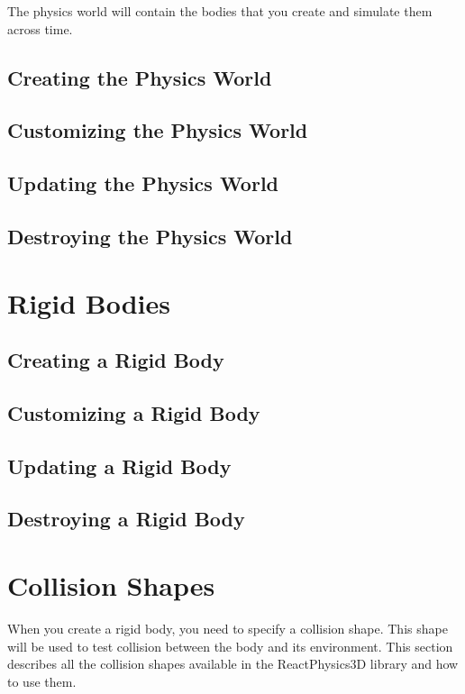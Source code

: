 \documentclass[a4paper,12pt]{article}
\begin{document}
    The physics world will contain the bodies that you create and simulate them across time.

    \subsection{Creating the Physics World}

    \subsection{Customizing the Physics World}

    \subsection{Updating the Physics World}

    \subsection{Destroying the Physics World}

    \section{Rigid Bodies}

    \subsection{Creating a Rigid Body}

    \subsection{Customizing a Rigid Body}

    \subsection{Updating a Rigid Body}

    \subsection{Destroying a Rigid Body}

    \section{Collision Shapes}

    When you create a rigid body, you need to specify a collision shape. This shape will be used to test collision between the body and its environment.
    This section describes all the collision shapes available in the ReactPhysics3D library and how to use them. \\
\end{document}
